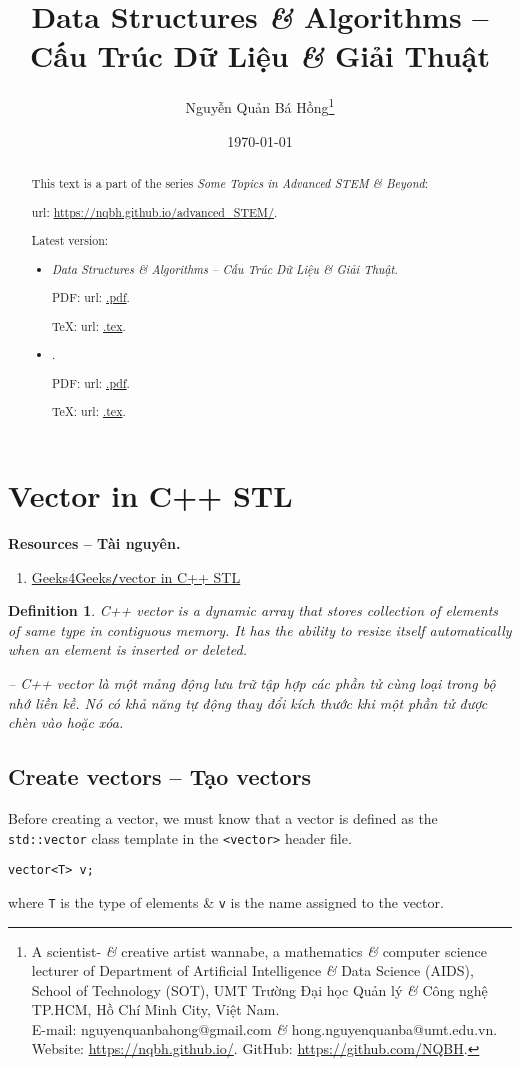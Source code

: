 \documentclass{article}
\title{Data Structures {\it\&} Algorithms -- Cấu Trúc Dữ Liệu {\it\&} Giải Thuật}
\author{Nguyễn Quản Bá Hồng\footnote{A scientist- {\it\&} creative artist wannabe, a mathematics {\it\&} computer science lecturer of Department of Artificial Intelligence {\it\&} Data Science (AIDS), School of Technology (SOT), UMT Trường Đại học Quản lý {\it\&} Công nghệ TP.HCM, Hồ Chí Minh City, Việt Nam.\\E-mail: {\sf nguyenquanbahong@gmail.com} {\it\&} {\sf hong.nguyenquanba@umt.edu.vn}. Website: \url{https://nqbh.github.io/}. GitHub: \url{https://github.com/NQBH}.}}
\date{\today}
\newtheorem{definition}{Definition}
\begin{document}
\maketitle
\begin{abstract}
	This text is a part of the series {\it Some Topics in Advanced STEM \& Beyond}:
	
	{\sc url}: \url{https://nqbh.github.io/advanced_STEM/}.
	
	Latest version:
	\begin{itemize}
		\item {\it Data Structures \& Algorithms -- Cấu Trúc Dữ Liệu \& Giải Thuật}.
		
		PDF: {\sc url}: \url{.pdf}.
		
		\TeX: {\sc url}: \url{.tex}.
		\item {\it }.
		
		PDF: {\sc url}: \url{.pdf}.
		
		\TeX: {\sc url}: \url{.tex}.
	\end{itemize}
\end{abstract}
\tableofcontents


\section{Vector in C++ STL}
\textbf{\textsf{Resources -- Tài nguyên.}}
\begin{enumerate}
	\item \href{https://www.geeksforgeeks.org/vector-in-cpp-stl/}{Geeks4Geeks{\tt/}vector in C++ STL}
\end{enumerate}

\begin{definition}
	{\rm C++ vector} is a dynamic array that stores collection of elements of same type in contiguous memory. It has the ability to resize itself automatically when an element is inserted or deleted.
	
	-- {\rm C++ vector} là một mảng động lưu trữ tập hợp các phần tử cùng loại trong bộ nhớ liền kề. Nó có khả năng tự động thay đổi kích thước khi một phần tử được chèn vào hoặc xóa.
\end{definition}


\subsection{Create vectors -- Tạo vectors}
Before creating a vector, we must know that a vector is defined as the {\tt std::vector} class template in the {\tt<vector>} header file.
\begin{verbatim}
vector<T> v;
\end{verbatim}
where {\tt T} is the type of elements \& {\tt v} is the name assigned to the vector.
\end{document}
